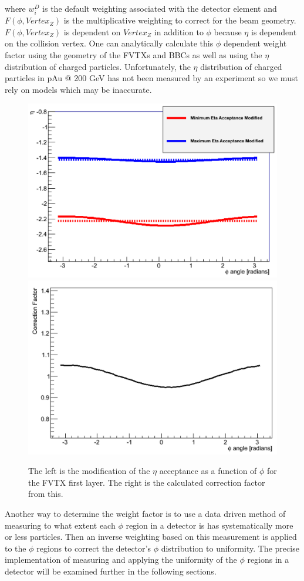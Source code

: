 where $w^D_i$ is the default weighting associated with the detector element and $F(\phi,Vertex_Z)$ is the multiplicative weighting to correct for the beam geometry. $F(\phi,Vertex_Z)$ is dependent on $Vertex_Z$ in addition to $\phi$ because $\eta$ is dependent on the collision vertex. One can analytically calculate this $\phi$ dependent weight factor using the geometry of the FVTXs and BBCs as well as using the $\eta$ distribution of charged particles. Unfortunately, the $\eta$ distribution of charged particles in pAu @ 200 GeV has not been measured by an experiment so we must rely on models which may be inaccurate.

\begin{figure}[h!]
\begin{center}
\includegraphics[width=0.47\linewidth]{figs/eta_modification.png}
\includegraphics[width=0.47\linewidth]{figs/analytic_correction.png}
\caption{The left is the modification of the $\eta$ acceptance as a function of $\phi$ for the FVTX first layer. The right is the calculated correction factor from this.}
\label{fig:analytic_corr}
\end{center}
\end{figure}

Another way to determine the weight factor is to use a data driven method of measuring to what extent each $\phi$ region in a detector is has systematically more or less particles. Then an inverse weighting based on this measurement is applied to the $\phi$ regions to correct the detector's $\phi$ distribution to uniformity. The precise implementation of measuring and applying the uniformity of the $\phi$ regions in a detector will be examined further in the following sections.

